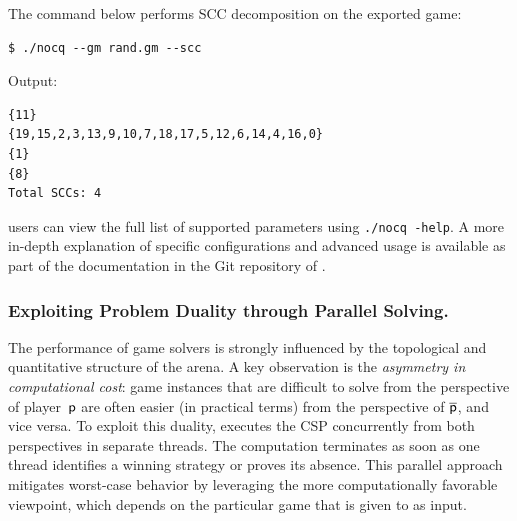 \documentclass[runningheads]{llncs}
\begin{document}
\noindent The command below performs SCC decomposition on the exported game:
\begin{lstlisting}
$ ./nocq --gm rand.gm --scc
\end{lstlisting}

\noindent Output:
\begin{lstlisting}
{11}
{19,15,2,3,13,9,10,7,18,17,5,12,6,14,4,16,0}
{1}
{8}
Total SCCs: 4
\end{lstlisting}

\noindent \nocq users can view the full list of supported parameters using \texttt{./nocq -\-help}. A more in-depth explanation of specific configurations and advanced usage is available as part of the documentation in the Git repository of \nocq. 

\subsubsection{Exploiting Problem Duality through Parallel Solving.}

The performance of game solvers is strongly influenced by the topological and quantitative structure of the arena. A key observation is the \emph{asymmetry in computational cost}: game instances that are difficult to solve from the perspective of player~$\mathsf{p}$ are often easier (in practical terms) from the perspective of $\overline{\mathsf{p}}$, and vice versa.
%
To exploit this duality, \nocq executes the CSP concurrently from both perspectives in separate threads. The computation terminates as soon as one thread identifies a winning strategy or proves its absence. This parallel approach mitigates worst-case behavior by leveraging the more computationally favorable viewpoint, which depends on the particular game that is given to \nocq as input. 



\end{document}
